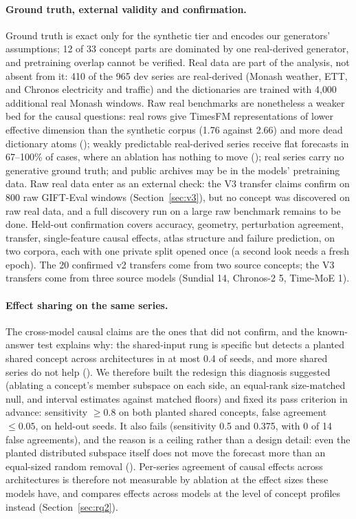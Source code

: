 \paragraph{Ground truth, external validity and confirmation.} Ground truth is exact only for the synthetic tier and
encodes our generators' assumptions; 12 of 33 concept parts are dominated by one real-derived generator, and pretraining
overlap cannot be verified. Real data are part of the analysis, not absent from it: 410 of the 965 dev series are real-derived
(Monash weather, ETT, and Chronos electricity and traffic) and the dictionaries are trained with 4{,}000 additional real
Monash windows. Raw real benchmarks are nonetheless a weaker bed for the causal questions: real rows give TimesFM
representations of lower effective dimension than the synthetic corpus (1.76 against 2.66) and more dead dictionary
atoms (); weakly predictable real-derived series receive flat forecasts in 67--100\% of cases, where an
ablation has nothing to move (); real series carry no generative ground truth; and public archives may be in
the models' pretraining data. Raw real data enter as an external check: the V3 transfer claims confirm on 800 raw
GIFT-Eval windows (Section~\ref{sec:v3}), but no concept was discovered on raw real data, and a full discovery run on a
large raw benchmark remains to be done. Held-out confirmation covers accuracy, geometry, perturbation agreement,
transfer, single-feature causal effects, atlas structure and failure prediction, on two corpora, each with one private
split opened once (a second look needs a fresh epoch). The 20 confirmed v2 transfers come from two source concepts; the
V3 transfers come from three source models (Sundial 14, Chronos-2 5, Time-MoE 1).

\paragraph{Effect sharing on the same series.} The cross-model causal claims are the ones that did not confirm, and the
known-answer test explains why: the shared-input rung is specific but detects a planted shared concept across
architectures in at most 0.4 of seeds, and more shared series do not help (). We therefore built the redesign
this diagnosis suggested (ablating a concept's member subspace on each side, an equal-rank size-matched null, and
interval estimates against matched floors) and fixed its pass criterion in advance: sensitivity $\ge0.8$ on both planted
shared concepts, false agreement $\le0.05$, on held-out seeds. It also fails (sensitivity 0.5 and 0.375, with 0 of 14
false agreements), and the reason is a ceiling rather than a design detail: even the planted distributed subspace itself
does not move the forecast more than an equal-sized random removal (). Per-series agreement of causal
effects across architectures is therefore not measurable by ablation at the effect sizes these models have, and
\tool{} compares effects across models at the level of concept profiles instead (Section~\ref{sec:rq2}).

